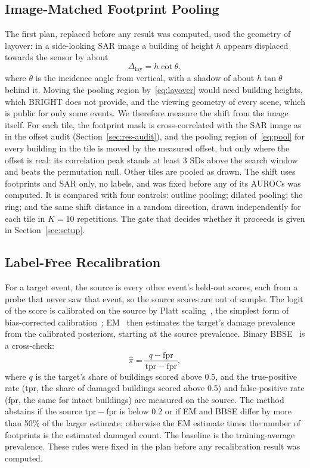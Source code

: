 \documentclass[journal]{IEEEtran}
\begin{document}
\subsection{Image-Matched Footprint Pooling}
\label{sec:c2}
The first plan, replaced before any result was computed, used the geometry of layover: in a side-looking SAR image a building of height $h$ appears displaced towards the sensor by about
\begin{equation}
\Delta_{\mathrm{lay}}=h\cot\theta,
\label{eq:layover}
\end{equation}
where $\theta$ is the incidence angle from vertical, with a shadow of about $h\tan\theta$ behind it. Moving the pooling region by~\eqref{eq:layover} would need building heights, which BRIGHT does not provide, and the viewing geometry of every scene, which is public for only some events. We therefore measure the shift from the image itself. For each tile, the footprint mask is cross-correlated with the SAR image as in the offset audit (Section~\ref{sec:res-audit}), and the pooling region of~\eqref{eq:pool} for every building in the tile is moved by the measured offset, but only where the offset is real: its correlation peak stands at least 3 SDs above the search window and beats the permutation null. Other tiles are pooled as drawn. The shift uses footprints and SAR only, no labels, and was fixed before any of its AUROCs was computed. It is compared with four controls: outline pooling; dilated pooling; the ring; and the same shift distance in a random direction, drawn independently for each tile in $K=10$ repetitions. The gate that decides whether it proceeds is given in Section~\ref{sec:setup}.

\subsection{Label-Free Recalibration}
For a target event, the source is every other event's held-out scores, each from a probe that never saw that event, so the source scores are out of sample. The logit of the score is calibrated on the source by Platt scaling~\cite{platt1999probabilistic}, the simplest form of bias-corrected calibration~\cite{alexandari2020bcts}; EM~\cite{saerens2002adjusting} then estimates the target's damage prevalence from the calibrated posteriors, starting at the source prevalence. Binary BBSE~\cite{lipton2018bbse} is a cross-check:
\begin{equation}
\hat\pi=\frac{q-\mathrm{fpr}}{\mathrm{tpr}-\mathrm{fpr}},
\label{eq:bbse}
\end{equation}
where $q$ is the target's share of buildings scored above 0.5, and the true-positive rate (tpr, the share of damaged buildings scored above 0.5) and false-positive rate (fpr, the same for intact buildings) are measured on the source. The method abstains if the source $\mathrm{tpr}-\mathrm{fpr}$ is below 0.2 or if EM and BBSE differ by more than 50\% of the larger estimate; otherwise the EM estimate times the number of footprints is the estimated damaged count. The baseline is the training-average prevalence. These rules were fixed in the plan before any recalibration result was computed.
\end{document}

